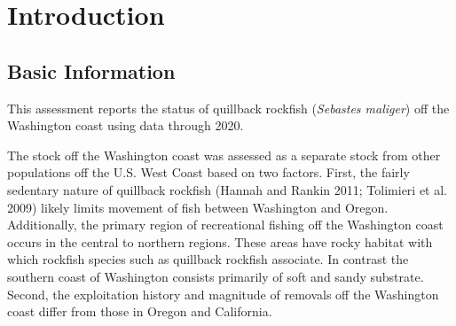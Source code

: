 \documentclass[11pt,
  english,
  letterpaper,
]{article}
\begin{document}
\newcommand{\lt}{\ensuremath <}
\newcommand{\gt}{\ensuremath >}

\setcounter{page}{1}

\renewcommand{\thetable}{\roman{table}}
\renewcommand{\thefigure}{\roman{figure}}

\setlength\parskip{0.5em plus 0.1em minus 0.2em}

\vspace{500cm}

\pagebreak

\pagebreak
{}
\setcounter{page}{1}
\renewcommand{\thefigure}{\arabic{figure}}
\renewcommand{\thetable}{\arabic{table}}
\setcounter{table}{0}
\setcounter{figure}{0}


\hypertarget{introduction}{%
\section{Introduction}\label{introduction}}

\leavevmode\tagmcend\tagstructend


\hypertarget{basic-information}{%
\subsection{Basic Information}\label{basic-information}}

\leavevmode\tagmcend\tagstructend


This assessment reports the status of quillback rockfish (\emph{Sebastes maliger}) off the Washington coast using data through 2020.

\leavevmode\tagmcend\tagstructend\par


The stock off the Washington coast was assessed as a separate stock from other populations off the U.S. West Coast based on two factors. First, the fairly sedentary nature of quillback rockfish {(Hannah and Rankin 2011; Tolimieri et al. 2009)\leavevmode\tagmcend\tagstructend} likely limits movement of fish between Washington and Oregon. Additionally, the primary region of recreational fishing off the Washington coast occurs in the central to northern regions. These areas have rocky habitat with which rockfish species such as quillback rockfish associate. In contrast the southern coast of Washington consists primarily of soft and sandy substrate. Second, the exploitation history and magnitude of removals off the Washington coast differ from those in Oregon and California.
\end{document}
